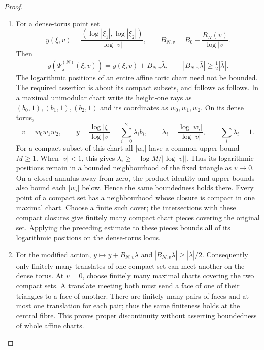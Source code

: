 \begin{proof}
\begin{enumerate}[label=\arabic*.,leftmargin=*]
\item For a dense-torus point set
\[
 y(\xi,v)=\frac{(\log|\xi_1|,\log|\xi_2|)}{\log|v|},
 \qquad
 B_{N,v}=B_0+\frac{R_N(v)}{\log|v|}.
\]
Then
\[
 y(\Psi^{(N)}_{\bar\lambda}(\xi,v))
 =y(\xi,v)+B_{N,v}\bar\lambda,
 \qquad
 |B_{N,v}\bar\lambda|\ge\tfrac12|\bar\lambda|.
\]
The logarithmic positions of an entire affine toric chart need not be
bounded. The required assertion is about its compact subsets, and follows
as follows. In a maximal unimodular chart write its height-one rays as
$(b_0,1),(b_1,1),(b_2,1)$ and its coordinates as $w_0,w_1,w_2$.
On its dense torus,
\[
 v=w_0w_1w_2,\qquad
 y=\frac{\log|\xi|}{\log|v|}
   =\sum_{i=0}^2\lambda_i b_i,\qquad
 \lambda_i=\frac{\log|w_i|}{\log|v|},\qquad
 \sum_i\lambda_i=1.
\]
For a compact subset of this chart all $|w_i|$ have a common upper
bound $M\ge1$. When $|v|<1$, this gives
$\lambda_i\ge-\log M/|\log|v||$. Thus its logarithmic positions remain
in a bounded neighbourhood of the fixed triangle as $v\to0$.
On a closed annulus away from zero, the product identity and upper
bounds also bound each $|w_i|$ below. Hence the same boundedness holds
there. Every point of a compact set has a neighbourhood whose closure
is compact in one maximal chart.  Choose a finite such cover;
the intersections with these compact closures give finitely many
compact chart pieces covering the original set.  Applying the
preceding estimate to these pieces bounds all of its logarithmic
positions on the dense-torus locus.

\item For the modified action,
$y\mapsto y+B_{N,v}\bar\lambda$ and
$|B_{N,v}\bar\lambda|\ge|\bar\lambda|/2$.
Consequently only finitely many translates of one compact set can
meet another on the dense torus. At $v=0$, choose finitely many
maximal charts covering the two compact sets. A translate meeting
both must send a face of one of their triangles to a face of another.
There are finitely many pairs of faces and at most one translation
for each pair; thus the same finiteness holds at the central fibre.
This proves proper discontinuity without asserting boundedness of
whole affine charts.


\end{enumerate}
\end{proof}
